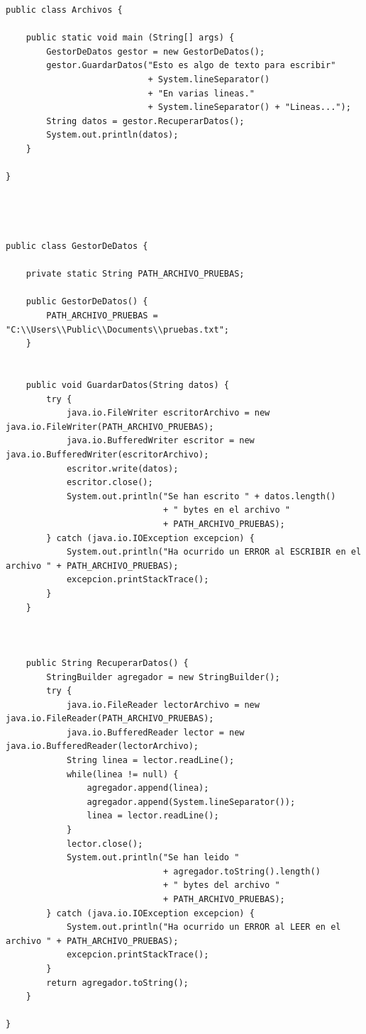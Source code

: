 \documentclass[spanish,12pt,a4paper,final,oneside]{book}
\begin{document}
\begin{lstlisting}[frame=single, caption=lenguaje java]
public class Archivos {
	
    public static void main (String[] args) {
        GestorDeDatos gestor = new GestorDeDatos();
        gestor.GuardarDatos("Esto es algo de texto para escribir" 
                            + System.lineSeparator() 
                            + "En varias lineas." 
                            + System.lineSeparator() + "Lineas...");
        String datos = gestor.RecuperarDatos();
        System.out.println(datos);
    }
    
}




public class GestorDeDatos {    
    
    private static String PATH_ARCHIVO_PRUEBAS;
    
    public GestorDeDatos() {
        PATH_ARCHIVO_PRUEBAS = "C:\\Users\\Public\\Documents\\pruebas.txt";
    }
    
    
    public void GuardarDatos(String datos) {
        try {
            java.io.FileWriter escritorArchivo = new java.io.FileWriter(PATH_ARCHIVO_PRUEBAS);
            java.io.BufferedWriter escritor = new java.io.BufferedWriter(escritorArchivo);
            escritor.write(datos);
            escritor.close();
            System.out.println("Se han escrito " + datos.length() 
                               + " bytes en el archivo " 
                               + PATH_ARCHIVO_PRUEBAS);
        } catch (java.io.IOException excepcion) {
            System.out.println("Ha ocurrido un ERROR al ESCRIBIR en el archivo " + PATH_ARCHIVO_PRUEBAS);
            excepcion.printStackTrace();
        }
    }
    
    
    
    public String RecuperarDatos() {
        StringBuilder agregador = new StringBuilder();
        try {
            java.io.FileReader lectorArchivo = new java.io.FileReader(PATH_ARCHIVO_PRUEBAS);
            java.io.BufferedReader lector = new java.io.BufferedReader(lectorArchivo);
            String linea = lector.readLine();
            while(linea != null) {
                agregador.append(linea);
                agregador.append(System.lineSeparator());
                linea = lector.readLine();
            }
            lector.close();
            System.out.println("Se han leido " 
                               + agregador.toString().length() 
                               + " bytes del archivo " 
                               + PATH_ARCHIVO_PRUEBAS);
        } catch (java.io.IOException excepcion) {
            System.out.println("Ha ocurrido un ERROR al LEER en el archivo " + PATH_ARCHIVO_PRUEBAS);
            excepcion.printStackTrace();
        }
        return agregador.toString();
    }
 
}   
\end{lstlisting}
\end{document}
